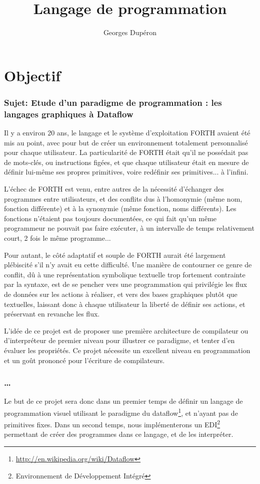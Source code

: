 \documentclass{article}
\author{Georges Dupéron}
\title{Langage de programmation}
\begin{document}
\maketitle
\tableofcontents
\newpage

\part{Objectif}

\section[Sujet]{Sujet: Etude d'un paradigme de programmation : les langages graphiques à Dataflow}
Il y a environ 20 ans, le langage et le système d'exploitation FORTH avaient été mis au point, avec pour but de créer un environnement
totalement personnalisé pour chaque utilisateur. La particularité de FORTH était qu'il ne possédait pas de mots-clés, ou instructions
figées, et que chaque utilisateur était en mesure de définir lui-même ses propres primitives, voire redéfinir ses primitives... à
l'infini.

L'échec de FORTH est venu, entre autres de la nécessité d'échanger des programmes entre utilisateurs, et des conflits dus à l'homonymie
(même nom, fonction différente) et à la synonymie (même fonction, noms différents). %
Les fonctions n'étaient pas toujours documentées, ce qui fait qu'un même programmeur ne pouvait pas faire exécuter, à un intervalle de
temps relativement court, 2 fois le même programme...

Pour autant, le côté adaptatif et souple de FORTH aurait été largement plébiscité s'il n'y avait eu cette difficulté. Une manière de
contourner ce genre de conflit, dû à une représentation symbolique textuelle trop fortement contrainte par la syntaxe, est de se pencher
vers une programmation qui privilégie les flux de données sur les actions à réaliser, et vers des bases graphiques plutôt que textuelles,
laissant donc à chaque utilisateur la liberté de définir ses actions, et préservant en revanche les flux.

L'idée de ce projet est de proposer une première architecture de compilateur ou d'interpréteur de premier niveau pour illustrer ce
paradigme, et tenter d'en évaluer les propriétés. Ce projet nécessite un excellent niveau en programmation et un goût prononcé pour
l'écriture de compilateurs.

\section{…}
Le but de ce projet sera donc dans un premier temps de définir un langage de programmation visuel utilisant le paradigme du
dataflow\footnote{\url{http://en.wikipedia.org/wiki/Dataflow}}, et n'ayant pas de primitives fixes. Dans un second temps, nous
implémenterons un EDI\footnote{Environnement de Développement Intégré} permettant de créer des programmes dans ce langage, et de les
interpréter.
\end{document}
